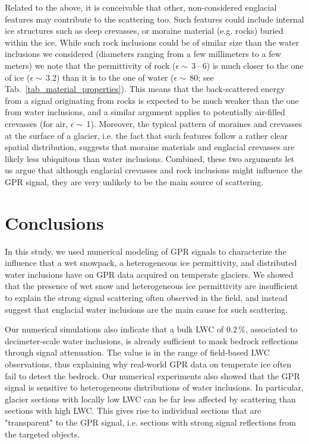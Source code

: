 Related to the above, it is conceivable that other, non-considered englacial features may contribute to the scattering too. Such features could include internal ice structures such as deep crevasses, or moraine material (e.g. rocks) buried within the ice. While such rock inclusions could be of similar size than the water inclusions we considered (diameters ranging from a few millimeters to a few meters) we note that the permittivity of rock ($\epsilon \sim$\,3\,--\,6) is much closer to the one of ice ($\epsilon \sim$\,3.2) than it is to the one of water ($\epsilon \sim$\,80; see Tab.~\ref{tab_material_properties}). This means that the back-scattered energy from a signal originating from rocks is expected to be much weaker than the one from water inclusions, and a similar argument applies to potentially air-filled crevasses (for air, $\epsilon \sim$\,1). Moreover, the typical pattern of moraines and crevasses at the surface of a glacier, i.e. the fact that such features follow a rather clear spatial distribution, suggests that moraine materials and englacial crevasses are likely less ubiquitous than water inclusions. Combined, these two arguments let us argue that although englacial crevasses and rock inclusions might influence the GPR signal, they are very unlikely to be the main source of scattering.


\section{Conclusions}

In this study, we used numerical modeling of GPR signals to characterize the influence that a wet snowpack, a heterogeneous ice permittivity, and distributed water inclusions have on GPR data acquired on temperate glaciers. We showed that the presence of wet snow and heterogeneous ice permittivity are insufficient to explain the strong signal scattering often observed in the field, and instead suggest that englacial water inclusions are the main cause for such scattering.

Our numerical simulations also indicate that a bulk LWC of 0.2\,\%, associated to decimeter-scale water inclusions, is already sufficient to mask bedrock reflections through signal attenuation. The value is in the range of field-based LWC observations, thus explaining why real-world GPR data on temperate ice often fail to detect the bedrock. Our numerical experiments also showed that the GPR signal is sensitive to heterogeneous distributions of water inclusions. In particular, glacier sections with locally low LWC can be far less affected by scattering than sections with high LWC. This gives rise to individual sections that are "transparent" to the GPR signal, i.e. sections with strong signal reflections from the targeted objects.

